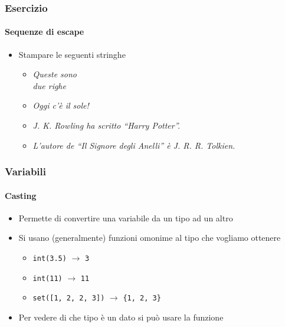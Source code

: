 \begin{exerciseframe}
    \frametitle{Esercizio}
    \framesubtitle{Sequenze di escape}

    \begin{itemize}
        \item Stampare le seguenti stringhe
        \begin{itemize}
            \item \textit{Queste sono\\due righe}
            \smallskip
            \item \textit{Oggi c'è il sole!}
            \smallskip
            \item \textit{J. K. Rowling ha scritto ``Harry Potter''.}
            \smallskip
            \item \textit{L'autore de ``Il Signore degli Anelli'' è J. R. R. Tolkien.}
        \end{itemize}
    \end{itemize}
\end{exerciseframe}


\begin{contentframe}
    \frametitle{Variabili}
    \framesubtitle{Casting}

    \begin{itemize}
        \item Permette di convertire una variabile da un tipo ad un altro

        \bigskip
        \item Si usano (generalmente) funzioni omonime al tipo che vogliamo ottenere
        \begin{itemize}
            \item \texttt{int(3.5)} $\rightarrow$ \texttt{3}
            \item \texttt{int(\textquotesingle{}11\textquotesingle{})} $\rightarrow$ \texttt{11}
            \item \texttt{set([1, 2, 2, 3])} $\rightarrow$ \texttt{\{1, 2, 3\}}
        \end{itemize}

        \bigskip
        \item Per vedere di che tipo è un dato si può usare la funzione 
        
    \end{itemize}
\end{contentframe}


